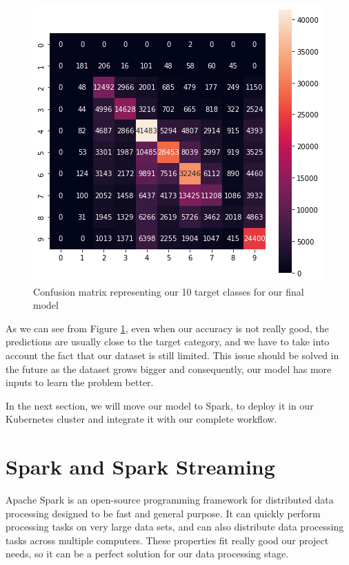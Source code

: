 \begin{figure}[H]
	\centering
	\includegraphics[width=1\linewidth]{imagenes/confusion-matrix.png}
	\caption{Confusion matrix representing our 10 target classes for our final model}
	\label{confusion-matrix}
\end{figure}

As we can see from Figure \ref{confusion-matrix}, even when our accuracy is not really good, the predictions are usually close to the target category, and we have to take into account the fact that our dataset is still limited. This issue should be solved in the future as the dataset grows bigger and consequently, our model has more inputs to learn the problem better.

In the next section, we will move our model to Spark, to deploy it in our Kubernetes cluster and integrate it with our complete workflow.

\clearpage

\section{Spark and Spark Streaming}
\label{section:Spark}
Apache Spark\cite{spark} is an open-source programming framework for distributed data processing designed to be fast and general purpose\cite{spark}. It can quickly perform processing tasks on very large data sets, and can also distribute data processing tasks across multiple computers. These properties fit really good our project needs, so it can be a perfect solution for our data processing stage.


